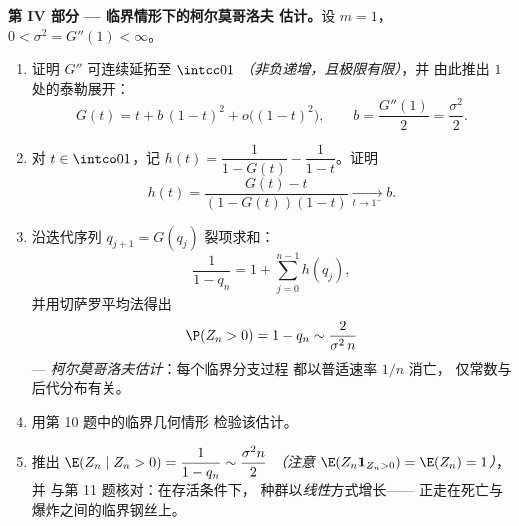 \begin{problem}
\medskip
\noindent\textbf{第 IV 部分 --- 临界情形下的柯尔莫哥洛夫
估计。}设 $m = 1$，$0 < \sigma^2 = G''(1) <
\infty$。
\begin{enumerate}[resume]
  \item 证明 $G''$ 可连续延拓至 $\intcc01$
        \emph{（非负递增，且极限有限）}，并
        由此推出 $1$ 处的泰勒展开：
        \[
        G(t) = t + b\,(1-t)^2 + o\bigl((1-t)^2\bigr),
        \qquad b = \frac{G''(1)}2 = \frac{\sigma^2}2 .
        \]
  \item 对 $t \in \intco01$，记 $h(t) = \dfrac1{1 - G(t)} -
        \dfrac1{1 - t}$。证明
        \[
        h(t) = \frac{G(t) - t}{(1 - G(t))(1 - t)}
        \xrightarrow[t\to1^-]{} b .
        \]
  \item 沿迭代序列 $q_{j+1} = G(q_j)$ 裂项求和：
        \[
        \frac1{1 - q_n} = 1 + \sum_{j=0}^{n-1}h(q_j),
        \]
        并用切萨罗平均法得出
        \[
        \P(Z_n > 0) = 1 - q_n \sim \frac{2}{\sigma^2\,n}
        \]
        --- \emph{柯尔莫哥洛夫估计}：每个临界分支过程
        都以普适速率 $1/n$ 消亡，
        仅常数与后代分布有关。
  \item 用第 10 题中的临界几何情形
        检验该估计。
  \item 推出 $\E(Z_n \mid Z_n > 0) = \dfrac{1}{1 - q_n}
        \sim \dfrac{\sigma^2 n}{2}$ \emph{（注意 $\E(Z_n
        \mathbf 1_{Z_n>0}) = \E(Z_n) = 1$）}，并
        与第 11 题核对：在存活条件下，
        种群以\emph{线性}方式增长——
        正走在死亡与爆炸之间的临界钢丝上。
\end{enumerate}


\end{problem}
